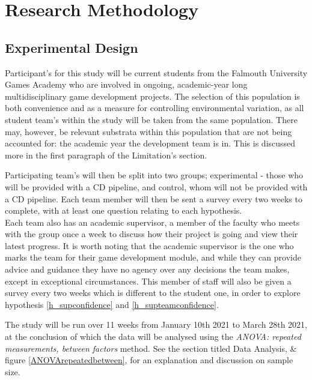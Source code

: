 \documentclass[lettersize,journal]{IEEEtran}
\begin{document}
\section{Research Methodology}
    \subsection{Experimental Design}
        Participant's for this study will be current students from the Falmouth University Games Academy who are involved in ongoing, academic-year long multidisciplinary game development projects. The selection of this population is both convenience and as a measure for controlling environmental variation, as all student team's within the study will be taken from the same population. There may, however, be relevant substrata within this population that are not being accounted for: the academic year the development team is in. This is discussed more in the first paragraph of the Limitation's section.

        Participating team's will then be split into two groups; experimental - those who will be provided with a CD pipeline, and control, whom will not be provided with a CD pipeline. Each team member will then be sent a survey every two weeks to complete, with at least one question relating to each hypothesis. \\
        Each team also has an academic supervisor, a member of the faculty who meets with the group once a week to discuss how their project is going and view their latest progress. It is worth noting that the academic supervisor is the one who marks the team for their game development module, and while they can provide advice and guidance they have no agency over any decisions the team makes, except in exceptional circumstances. This member of staff will also be given a survey every two weeks which is different to the student one, in order to explore hypothesis \ref{h_supconfidence} and \ref{h_supteamconfidence}.

        The study will be run over 11 weeks from January 10th 2021 to March 28th 2021, at the conclusion of which the data will be analysed using the \textit{ANOVA: repeated measurements, between factors} method. See the section titled Data Analysis, \& figure \ref{ANOVArepeatedbetween}, for an explanation and discussion on sample size.
    
\end{document}
